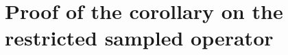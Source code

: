 \section{Proof of the corollary on the restricted sampled operator}
\label{sec:app-corollary-proof}

%
%
%
%
%

